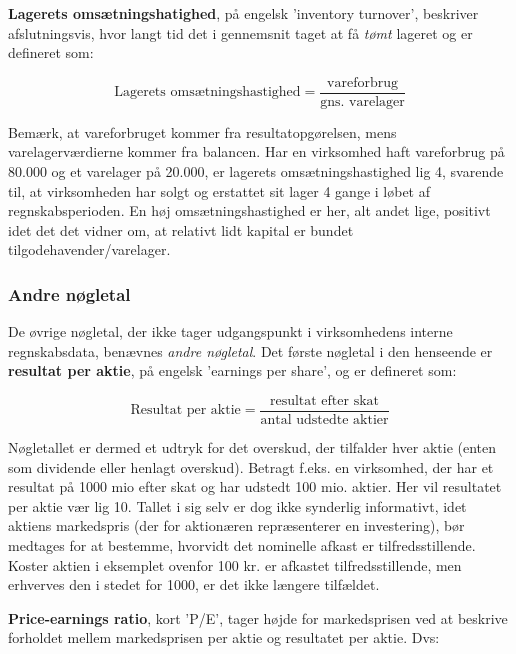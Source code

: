\documentclass[10pt,reqno, usenames]{article}
\begin{document}
\vspace{10 pt}
\textbf{Lagerets omsætningshatighed}, på engelsk 'inventory turnover', beskriver afslutningsvis, hvor langt tid det i gennemsnit taget at få \textit{tømt} lageret og er defineret som: 

\begin{equation}
    \text{Lagerets omsætningshastighed} =  \frac{\text{vareforbrug}}{\text{gns. varelager}}
\end{equation}

Bemærk, at vareforbruget kommer fra resultatopgørelsen, mens varelagerværdierne kommer fra balancen. Har en virksomhed haft vareforbrug på 80.000 og et varelager på 20.000, er lagerets omsætningshastighed lig 4, svarende til, at virksomheden har solgt og erstattet sit lager 4 gange i løbet af regnskabsperioden. En høj omsætningshastighed er her, alt andet lige, positivt idet det det vidner om, at relativt lidt kapital er bundet tilgodehavender/varelager. 

\subsubsection{Andre nøgletal}
De øvrige nøgletal, der ikke tager udgangspunkt i virksomhedens interne regnskabsdata, benævnes \textit{andre nøgletal}. Det første nøgletal i den henseende er \textbf{resultat per aktie}, på engelsk 'earnings per share', og er defineret som: 

\begin{equation}
    \text{Resultat per aktie} =  \frac{\text{resultat efter skat}}{\text{antal udstedte aktier}}
\end{equation}

Nøgletallet er dermed et udtryk for det overskud, der tilfalder hver aktie (enten som dividende eller henlagt overskud). Betragt f.eks. en virksomhed, der har et resultat på 1000 mio efter skat og har udstedt 100 mio. aktier. Her vil resultatet per aktie vær lig 10. Tallet i sig selv er dog ikke synderlig informativt, idet aktiens markedspris (der for aktionæren repræsenterer en investering), bør medtages for at bestemme, hvorvidt det nominelle afkast er tilfredsstillende. Koster aktien i eksemplet ovenfor 100 kr. er afkastet tilfredsstillende, men erhverves den i stedet for 1000, er det ikke længere tilfældet. 

\vspace{10 pt}
\textbf{Price-earnings ratio}, kort 'P/E', tager højde for markedsprisen ved at beskrive forholdet mellem markedsprisen per aktie og resultatet per aktie. Dvs: 
\end{document}
